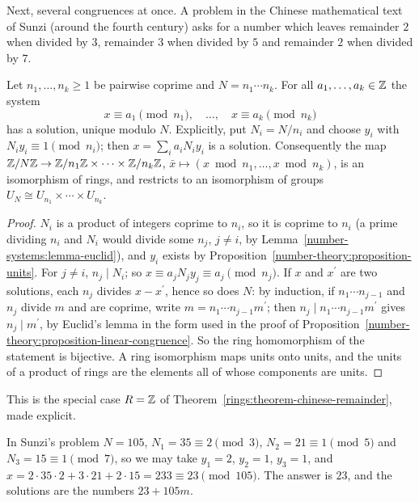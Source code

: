 Next, several congruences at once. A problem in the Chinese mathematical text of Sunzi (around the fourth century) asks for a number which leaves remainder $2$ when divided by $3$, remainder $3$ when divided
by $5$ and remainder $2$ when divided by $7$.

\begin{theorem}\label{number-theory:theorem-crt}
Let $n_1, \ldots, n_k \geq 1$ be pairwise coprime and $N = n_1 \cdots n_k$. For all $a_1, \ldots, a_k \in \mathbb{Z}$ the system
\[
x \equiv a_1 \pmod{n_1}, \quad \ldots, \quad x \equiv a_k \pmod{n_k}
\]
has a solution, unique modulo $N$. Explicitly, put $N_i = N/n_i$ and choose $y_i$ with $N_iy_i \equiv 1 \pmod{n_i}$; then $x = \sum_ia_iN_iy_i$ is a solution. Consequently the map
$\mathbb{Z}/N\mathbb{Z} \to \mathbb{Z}/n_1\mathbb{Z} \times \cdots \times \mathbb{Z}/n_k\mathbb{Z}$, $\bar{x} \mapsto (x \bmod n_1, \ldots, x \bmod n_k)$, is an isomorphism of rings, and restricts to an isomorphism of groups
$U_N \cong U_{n_1} \times \cdots \times U_{n_k}$.
\end{theorem}

\begin{proof}
$N_i$ is a product of integers coprime to $n_i$, so it is coprime to $n_i$ (a prime dividing $n_i$ and $N_i$ would divide some $n_j$, $j \neq i$, by Lemma~\ref{number-systems:lemma-euclid}), and $y_i$
exists by Proposition~\ref{number-theory:proposition-units}. For $j \neq i$, $n_j \mid N_i$; so $x \equiv a_jN_jy_j \equiv a_j \pmod{n_j}$. If $x$ and $x^{\prime}$ are two solutions, each $n_j$ divides
$x - x^{\prime}$, hence so does $N$: by induction, if $n_1 \cdots n_{j-1}$ and $n_j$ divide $m$ and are coprime, write $m = n_1 \cdots n_{j-1}m^{\prime}$; then $n_j \mid n_1 \cdots n_{j-1}m^{\prime}$
gives $n_j \mid m^{\prime}$, by Euclid's lemma in the form used in the proof of Proposition~\ref{number-theory:proposition-linear-congruence}. So the ring homomorphism of the statement is bijective. A ring
isomorphism maps units onto units, and the units of a product of rings are the elements all of whose components are units.
\end{proof}

This is the special case $R = \mathbb{Z}$ of Theorem~\ref{rings:theorem-chinese-remainder}, made explicit.

\begin{example}\label{number-theory:example-sunzi}
In Sunzi's problem $N = 105$, $N_1 = 35 \equiv 2 \pmod 3$, $N_2 = 21 \equiv 1 \pmod 5$ and $N_3 = 15 \equiv 1 \pmod 7$, so we may take $y_1 = 2$, $y_2 = 1$, $y_3 = 1$, and
$x = 2 \cdot 35 \cdot 2 + 3 \cdot 21 + 2 \cdot 15 = 233 \equiv 23 \pmod{105}$. The answer is $23$, and the solutions are the numbers $23 + 105m$.
\end{example}

